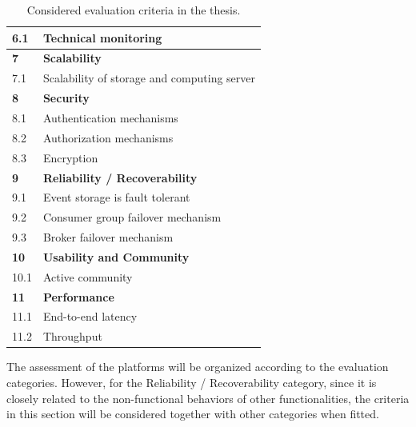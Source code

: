 \begin{table}[h]
\begin{tabular}{|l|l|}
		6.1          & Technical monitoring                                     \\ \hline
		\textbf{7}   & \textbf{Scalability}                                     \\ \hline
		7.1          & Scalability of storage and computing server              \\ \hline
		\textbf{8}   & \textbf{Security}                                        \\ \hline
		8.1          & Authentication mechanisms                                \\ \hline
		8.2          & Authorization mechanisms                                 \\ \hline
		8.3          & Encryption                                               \\ \hline
		\textbf{9}  & \textbf{Reliability / Recoverability}                    \\ \hline
		9.1         & Event storage is fault tolerant                          \\ \hline
		9.2         & Consumer group failover mechanism                        \\ \hline
		9.3         & Broker failover mechanism                                \\ \hline
		\textbf{10}  & \textbf{Usability and Community}                         \\ \hline
		10.1         & Active community                                       \\   \hline
		\textbf{11}  & \textbf{Performance}                                     \\ \hline
		11.1         & End-to-end latency                                       \\ \hline
		11.2         & Throughput                                               \\ \hline
	\end{tabular}
	\caption{Considered evaluation criteria in the thesis.}
	\label{table:criteria}
\end{table}

The assessment of the platforms will be organized according to the evaluation categories. However, for the Reliability / Recoverability category, since it is closely related to the non-functional behaviors of other functionalities, the criteria in this section will be considered together with other categories when fitted.




